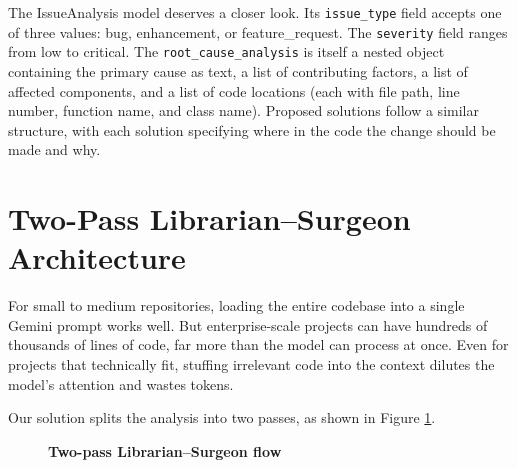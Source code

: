 The IssueAnalysis model deserves a closer look. Its \texttt{issue\_type} field accepts one of three values: bug, enhancement, or feature\_request. The \texttt{severity} field ranges from low to critical. The \texttt{root\_cause\_analysis} is itself a nested object containing the primary cause as text, a list of contributing factors, a list of affected components, and a list of code locations (each with file path, line number, function name, and class name). Proposed solutions follow a similar structure, with each solution specifying where in the code the change should be made and why.

\section{Two-Pass Librarian--Surgeon Architecture}

For small to medium repositories, loading the entire codebase into a single Gemini prompt works well. But enterprise-scale projects can have hundreds of thousands of lines of code, far more than the model can process at once. Even for projects that technically fit, stuffing irrelevant code into the context dilutes the model's attention and wastes tokens.

Our solution splits the analysis into two passes, as shown in Figure \ref{fig:twopass}.

\begin{figure}[htb]
\centering
{}
\caption[Two-pass Librarian--Surgeon flow]{\textbf{Two-pass Librarian--Surgeon flow}}
\vspace{2mm}
\label{fig:twopass}
\end{figure}

